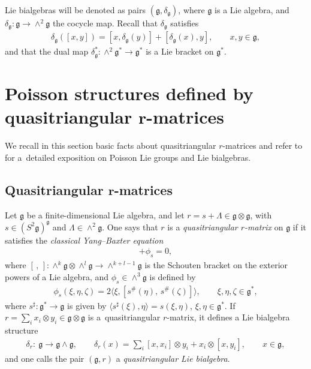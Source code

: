 \documentclass[pdftex]{sigma}
\numberwithin{equation}{section}
\def \g {\mathfrak{a}}
\def \g {\mathfrak{g}}
\newcommand{\la}{\langle}
\newcommand{\ra}{\rangle}
\begin{document}
Lie bialgebras will be denoted as pairs $(\g, \delta_\g)$, where $\g$ is a Lie algebra, and $\delta_\g\colon \g \to \wedge^2 \g$ the cocycle map. Recall that $\delta_\g$ satisf\/ies
\begin{gather*}
\delta_\g([x,y]) = [x, \delta_\g(y)] + [\delta_\g(x), y], \qquad x,y \in \g,
\end{gather*}
and that the dual map $\delta_\g^*\colon {\wedge}^2 \g^* \to \g^*$ is a Lie bracket on $\g^*$.

\section[Poisson structures def\/ined by quasitriangular $r$-matrices]{Poisson structures def\/ined by quasitriangular $\boldsymbol{r}$-matrices} \label{sec-quasitri}

We recall in this section basic facts about quasitriangular $r$-matrices and refer to \cite{Lu-Mou:mixed} for a~detailed exposition on Poisson Lie groups and Lie bialgebras.

\subsection[Quasitriangular $r$-matrices]{Quasitriangular $\boldsymbol{r}$-matrices}

Let $\g$ be a f\/inite-dimensional Lie algebra, and let $r = s + \Lambda \in \g \otimes \g$, with $s \in (S^2\g)^\g$ and $\Lambda \in \wedge^2 \g$. One says that $r$ is a {\it quasitriangular $r$-matrix} on $\g$ if it satisf\/ies the {\it classical Yang--Baxter equation}
\begin{gather*}
[\Lambda, \Lambda] + \phi_s = 0, %
\end{gather*}
where $[\, , \,]\colon \wedge^k \g \otimes \wedge^l \g \to \wedge^{k+l-1} \g$ is the Schouten bracket on the exterior powers of a Lie algebra, and $\phi_s \in \wedge^3 \g$ is def\/ined by
\begin{gather}
\phi_s(\xi, \eta, \zeta) = 2 \la \xi, [s^\#(\eta), \, s^\#(\zeta)]\ra, \qquad \xi, \eta, \zeta \in \g^*, \label{eq-cyb}
\end{gather}
where $s^\sharp\colon \g^* \to \g$ is given by $\la s^\sharp(\xi), \eta \ra = s(\xi, \eta)$, $\xi, \eta \in \g^*$. If $r = \sum_i x_i \otimes y_i \in \g \otimes \g$ is a~quasitriangular $r$-matrix, it def\/ines a Lie bialgebra structure
\begin{gather*}
\delta_r\colon \ \g \to \g \wedge \g, \qquad \delta_r(x) = \sum_i [x, x_i] \otimes y_i + x_i \otimes [x, y_i], \qquad x \in \g,
\end{gather*}
and one calls the pair $(\g, r)$ a {\it quasitriangular Lie bialgebra}.
\end{document}
